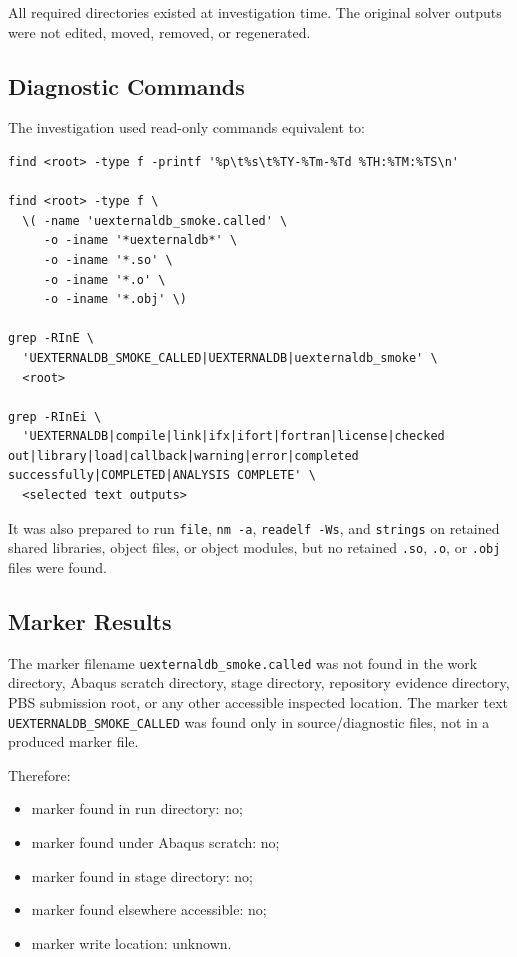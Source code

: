 \documentclass[11pt,a4paper]{article}
\begin{document}
All required directories existed at investigation time. The original solver outputs were not edited, moved, removed, or regenerated.

\subsection*{Diagnostic Commands}

The investigation used read-only commands equivalent to:

\begin{verbatim}
find <root> -type f -printf '%p\t%s\t%TY-%Tm-%Td %TH:%TM:%TS\n'

find <root> -type f \
  \( -name 'uexternaldb_smoke.called' \
     -o -iname '*uexternaldb*' \
     -o -iname '*.so' \
     -o -iname '*.o' \
     -o -iname '*.obj' \)

grep -RInE \
  'UEXTERNALDB_SMOKE_CALLED|UEXTERNALDB|uexternaldb_smoke' \
  <root>

grep -RInEi \
  'UEXTERNALDB|compile|link|ifx|ifort|fortran|license|checked out|library|load|callback|warning|error|completed successfully|COMPLETED|ANALYSIS COMPLETE' \
  <selected text outputs>
\end{verbatim}

It was also prepared to run \texttt{file}, \texttt{nm -a}, \texttt{readelf -Ws}, and \texttt{strings} on retained shared libraries, object files, or object modules, but no retained \texttt{.so}, \texttt{.o}, or \texttt{.obj} files were found.

\subsection*{Marker Results}

The marker filename \texttt{uexternaldb\_smoke.called} was not found in the work directory, Abaqus scratch directory, stage directory, repository evidence directory, PBS submission root, or any other accessible inspected location. The marker text \texttt{UEXTERNALDB\_SMOKE\_CALLED} was found only in source/diagnostic files, not in a produced marker file.

Therefore:

\begin{itemize}
  \item marker found in run directory: no;
  \item marker found under Abaqus scratch: no;
  \item marker found in stage directory: no;
  \item marker found elsewhere accessible: no;
  \item marker write location: unknown.
\end{itemize}
\end{document}
